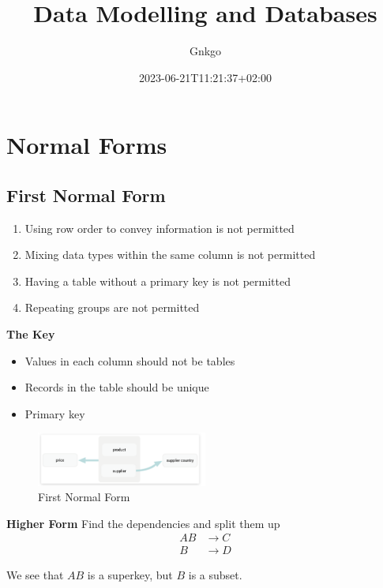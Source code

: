 \documentclass{article}
\title{Data Modelling and Databases}
\date{2023-06-21T11:21:37+02:00}
\author{Gnkgo}
\begin{document}
\maketitle

\clearpage

\tableofcontents

\clearpage

\section{Normal Forms}

\subsection{First Normal Form}
\begin{enumerate}
    \item Using row order to convey information is not permitted
    \item Mixing data types within the same column is not permitted
    \item Having a table without a primary key is not permitted
    \item Repeating groups are not permitted
\end{enumerate}

\textbf{The Key}
\begin{itemize}
    \item Values in each column should not be tables
    \item Records in the table should be unique
    \item Primary key
\end{itemize}

\begin{figure}[h]
    \centering
    \includegraphics[width=0.5\textwidth]{assets/first_normal_form.png}
    \caption{First Normal Form}
\end{figure}
\textbf{Higher Form}
Find the dependencies and split them up
\begin{align*}
    AB & \rightarrow C \\
    B  & \rightarrow D
\end{align*}

We see that $AB$ is a superkey, but $B$ is a subset.
\end{document}
